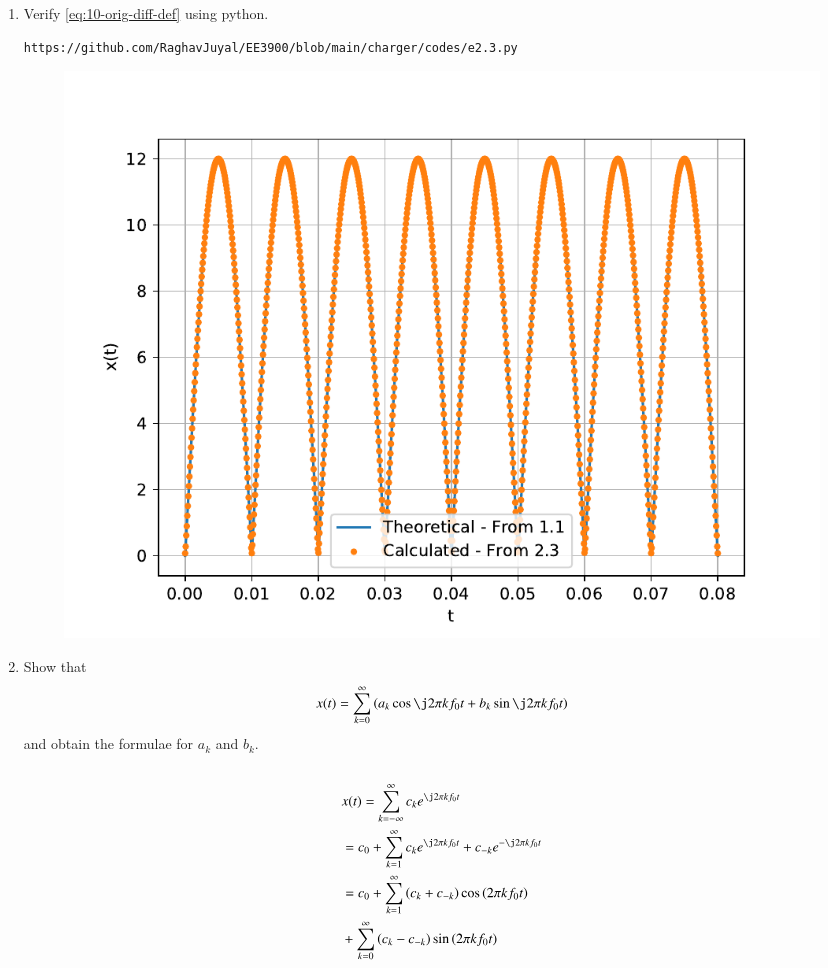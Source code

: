 \documentclass[journal,12pt,twocolumn]{IEEEtran}
\renewcommand\thesection{\arabic{section}}
\begin{document}
\begin{enumerate}[label=\thesection.\arabic*,ref=\thesection.\theenumi]
\item Verify 
	\eqref{eq:10-orig-diff-def}
	using python.
\begin{lstlisting}
https://github.com/RaghavJuyal/EE3900/blob/main/charger/codes/e2.3.py
\end{lstlisting}
\begin{figure}[!ht]
	\begin{center}
		\includegraphics[width=\columnwidth]{./figs/e2.3.pdf}
	\end{center}
	\label{fig:}	
\end{figure}	

\item Show that 
\begin{align}
	x(t) = \sum_{k = 0}^{\infty}\brak{a_k\cos{\j2\pi kf_0 t}+b_k\sin{\j2\pi kf_0 t}}
\label{eq:one-Z-real}
\end{align}
and obtain the formulae for $a_k$ and $b_k$.\\
\solution\\
\begin{align}
	&x(t) = \sum_{k = -\infty}^{\infty}c_ke^{\j2\pi kf_0 t} \\
	&= c_0 + \sum_{k = 1}^{\infty}c_ke^{\j2\pi kf_0t} + c_{-k}e^{-\j2\pi kf_0t} \\
	&= c_0 + \sum_{k = 1}^{\infty}\brak{c_k + c_{-k}}\cos\brak{2\pi kf_0t}  \nonumber \\
	&+ \sum_{k = 0}^{\infty}\brak{c_k - c_{-k}}\sin\brak{2\pi kf_0t}
\end{align}


\end{enumerate}
\end{document}
